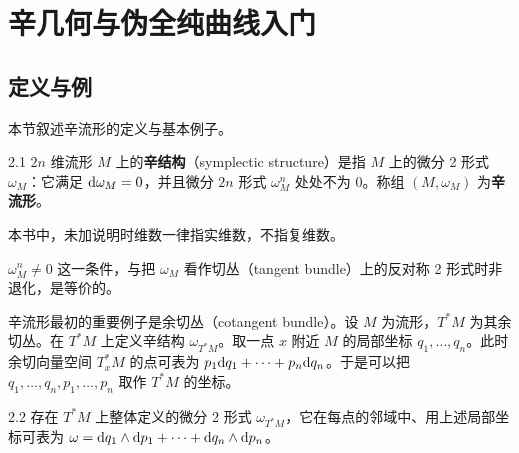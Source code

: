 \chapter{辛几何与伪全纯曲线入门}

\section{定义与例}


本节叙述辛流形的定义与基本例子。

\begin{definition}{2.1}
  $2n$ 维流形 $M$ 上的\textbf{辛结构}（symplectic structure）是指 $M$ 上的微分 2 形式 $\omega_M$：它满足 $\mathrm{d}\omega_M=0$，并且微分 $2n$ 形式 $\omega_M^n$ 处处不为 0。称组 $(M,\omega_M)$ 为\textbf{辛流形}。
\end{definition}

本书中，未加说明时维数一律指实维数，不指复维数。

$\omega_M^n\neq 0$ 这一条件，与把 $\omega_M$ 看作切丛（tangent bundle）上的反对称 2 形式时非退化，是等价的。

辛流形最初的重要例子是余切丛（cotangent bundle）。设 $M$ 为流形，$T^*M$ 为其余切丛。在 $T^*M$ 上定义辛结构 $\omega_{T^*M}$。取一点 $x$ 附近 $M$ 的局部坐标 $q_1,\dots,q_n$。此时余切向量空间 $T_x^*M$ 的点可表为 $p_1\mathrm{d} q_1+\cdots+p_n\mathrm{d} q_n$。于是可以把 $q_1,\dots,q_n,p_1,\dots,p_n$ 取作 $T^*M$ 的坐标。

\begin{lemma*}{2.2}
  存在 $T^*M$ 上整体定义的微分 2 形式 $\omega_{T^*M}$，它在每点的邻域中、用上述局部坐标可表为 $\omega=\mathrm{d} q_1\wedge\mathrm{d} p_1+\cdots+\mathrm{d} q_n\wedge\mathrm{d} p_n$。
\end{lemma*}

